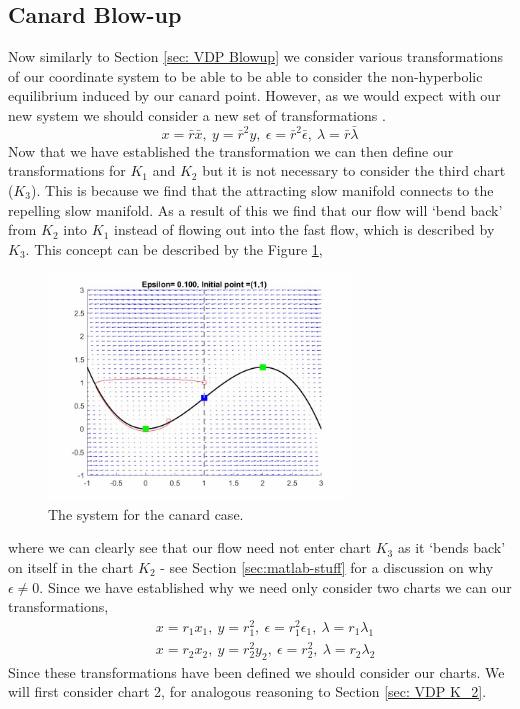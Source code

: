 \subsection{Canard Blow-up}
Now similarly to Section \ref{sec: VDP Blowup} we consider various transformations of our coordinate system to be able to be able to consider the non-hyperbolic equilibrium induced by our canard point. However, as we would expect with our new system we should consider a new set of transformations \citep{krupa2001}.
\begin{equation}
x=\bar{r}\bar{x}, \ y=\bar{r}^2y, \ \epsilon=\bar{r}^2\bar{\epsilon}, \ \lambda=\bar{r}\bar{\lambda}
\end{equation}
Now that we have established the transformation we can then define our transformations for $K_1$ and $K_2$ but it is not necessary to consider the third chart ($K_3$). This is because we find that the attracting slow manifold connects to the repelling slow manifold. As a result of this we find that our flow will `bend back' from $K_2$ into $K_1$ instead of flowing out into the fast flow, which is described by $K_3$. This concept can be described by the Figure \ref{fig: flow in canard},
\begin{figure}[h!]
	\centering
\includegraphics[width=8cm, height=6cm]{Images/vdPhopf-Moment-bendback}
	\caption{The \vdp system for the canard case.}
	\label{fig: flow in canard}
\end{figure}\newpage
where we can clearly see that our flow need not enter chart $ K_3 $ as it `bends back' on itself in the chart $ K_2 $ - see Section \ref{sec:matlab-stuff} for a discussion on why $ \epsilon\neq0 $. Since we have established why we need only consider two charts we can our transformations,
\begin{subequations}
	\begin{align}
	&x=r_1x_1, \ y=r_1^2, \ \epsilon=r_1^2\epsilon_1, \ \lambda=r_1\lambda_1 \label{eq: coordiante K1}\\ 
	&x=r_2x_2, \ y=r_2^2y_2, \ \epsilon=r^2_2, \ \lambda=r_2\lambda_2 \label{eq: coordinate K2}
	\end{align}
\end{subequations}
Since these transformations have been defined we should consider our charts. We will first consider chart 2, for analogous reasoning to Section \ref{sec: VDP K_2}. 

